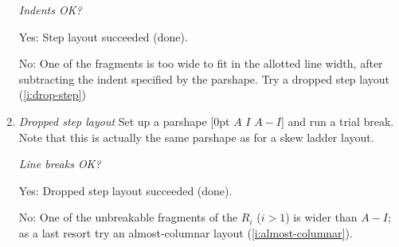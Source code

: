 \documentclass[twocolumn]{article}
\newcommand{\ititle}[1]{\textit{#1}}
\begin{document}
\begin{small}
\begin{enumerate}
\ititle{Indents OK?}

Yes: Step layout succeeded (done).

No: One of the fragments is too wide to fit in
the allotted line width, after subtracting the indent specified by the
parshape. Try a dropped step layout (\ref{i:drop-step})

\item\ititle{Dropped step layout}\label{i:drop-step} Set up a parshape
  [0pt $A$ $I$ $A-I$] and run a trial break.  Note that this is actually
  the same parshape as for a skew ladder layout.

\ititle{Line breaks OK?}

Yes: Dropped step layout succeeded (done).

No: One of the unbreakable fragments of the $R_i$ ($i>1$) is wider than
$A-I$; as a last resort try an almost-columnar layout (\ref{i:almost-columnar}).

\end{enumerate}
\par\end{small}
\end{document}
